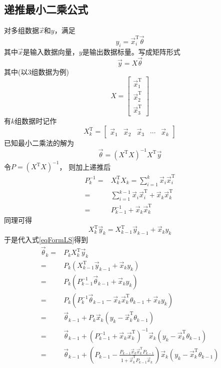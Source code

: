 \subsection{递推最小二乘公式}
对多组数据$\vec{x}$和$y$，满足
\[y_i = \vec{x}^\mathrm{T}_i\vec{\theta}\]
其中$\vec{x}$是输入数据向量，$y$是输出数据标量。写成矩阵形式
\[\vec{y} = X\vec{\theta}\]
其中(以3组数据为例)
\begin{equation*}
    X = \left[\begin{matrix}
        \vec{x}^\mathrm{T}_1 \\
        \vec{x}^\mathrm{T}_2 \\
        \vec{x}^\mathrm{T}_3
    \end{matrix}\right]
\end{equation*}
有$k$组数据时记作
\begin{equation*}
    X^\mathrm{T}_k = \left[\begin{matrix}
        \vec{x}_1 & \vec{x}_2 & \vec{x}_3 &
        \cdots & \vec{x}_k
    \end{matrix}\right]
\end{equation*}
已知最小二乘法的解为
\begin{equation}
    \vec{\theta}
    =(X^\mathrm{T}X)^{-1}
    X^\mathrm{T}\vec{y} \label{eqFormLS}
\end{equation}
令$P = (X^\mathrm{T}X)^{-1}$，
则加上递推后
\begin{align*}
    P_k^{-1} =& X_k^\mathrm{T}X_k
    = \sum_{i=1}^k\vec{x}_i\vec{x}^\mathrm{T}_i \\
    =& \sum_{i=1}^{k-1}\vec{x}_i\vec{x}^\mathrm{T}_i
    +\vec{x}_k\vec{x}^\mathrm{T}_k \\
    =& P_{k-1}^{-1} + \vec{x}_k\vec{x}_k^\mathrm{T}
\end{align*}
同理可得
\begin{equation*}
    X_k^\mathrm{T}\vec{y}_k
    =X_{k-1}^\mathrm{T}\vec{y}_{k-1}
    +\vec{x}_ky_k
\end{equation*}
于是代入式\eqref{eqFormLS}得到
\begin{align*}
    \vec{\theta}_k =& P_kX_k^\mathrm{T}\vec{y}_k \\
    =& P_k(X_{k-1}^\mathrm{T}\vec{y}_{k-1}
    +\vec{x}_ky_k) \\
    =& P_k(P_{k-1}^{-1}\vec{\theta}_{k-1}
    +\vec{x}_ky_k) \\
    =& P_k(P_k^{-1}\vec{\theta}_{k-1}
    -\vec{x}_k\vec{x}_k^\mathrm{T}\theta_{k-1}+\vec{x}_ky_k) \\
    =& \vec{\theta}_{k-1} + P_k\vec{x}_k
    (y_k-\vec{x}_k^\mathrm{T}\theta_{k-1}) \\
    =& \vec{\theta}_{k-1}
    +(P_{k-1}^{-1} + \vec{x}_k\vec{x}_k^\mathrm{T})^{-1}
    \vec{x}_k(y_k-\vec{x}_k^\mathrm{T}\theta_{k-1}) \\
    =& \vec{\theta}_{k-1}
    +(P_{k-1}-\frac{P_{k-1}\vec{x}_k\vec{x}_k^\mathrm{T}
    P_{k-1}}{1+\vec{x}_k^\mathrm{T}P_{k-1}\vec{x}_k})
    \vec{x}_k(y_k-\vec{x}_k^\mathrm{T}\theta_{k-1}) \\
\end{align*}
